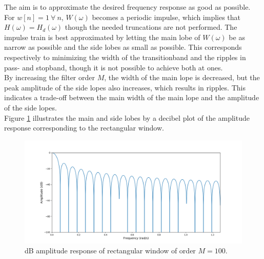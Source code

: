 The aim is to approximate the desired frequency response as good as possible. For $w[n]=1 \ \forall \ n$, $W(\omega)$ becomes a periodic impulse, which implies that $H(\omega) = H_d(\omega)$ though the needed truncations are not performed. The impulse train is best approximated by letting the main lobe of $W(\omega)$ be as narrow as possible and the side lobes as small as possible. This corresponds respectively to minimizing the width of the transitionband and the ripples in pass- and stopband, though it is not possible to achieve both at ones.\\
By increasing the filter order $M$, the width of the main lope is decreased, but the peak amplitude of the side lopes also increases, which results in ripples. This indicates a trade-off between the main width of the main lope and the amplitude of the side lopes. \\
Figure \ref{fig:rect_db} illustrates the main and side lobes by a decibel plot of the amplitude response corresponding to the rectangular window.
\begin{figure}[H]
\centering
\includegraphics[width=\textwidth]{figures/dbplots/rect.png}
\caption{dB amplitude response of rectangular window of order $M=100$.}
\label{fig:rect_db}
\end{figure}
